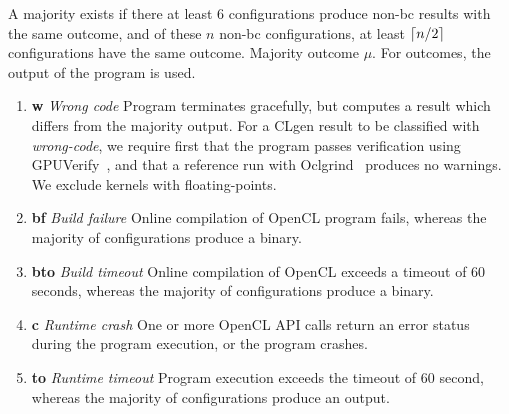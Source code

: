 A majority exists if there at least 6 configurations produce non-bc results with the same outcome, and of these $n$ non-bc configurations, at least $\lceil n/2\rceil$ configurations have the same outcome. Majority outcome $\mu$. For \cmark outcomes, the output of the program is used.

%
\begin{enumerate}
	\item \textbf{w} \emph{Wrong code} Program terminates gracefully, but computes a result which differs from the majority output. For a CLgen result to be classified with \emph{wrong-code}, we require first that the program passes verification using GPUVerify~\cite{Betts2012}, and that a reference run with Oclgrind~\cite{Price2015} produces no warnings. We exclude kernels with floating-points.
	\item \textbf{bf} \emph{Build failure} Online compilation of OpenCL program fails, whereas the majority of configurations produce a binary.
	\item \textbf{bto} \emph{Build timeout} Online compilation of OpenCL exceeds a timeout of 60 seconds, whereas the majority of configurations produce a binary.
	\item \textbf{c} \emph{Runtime crash} One or more OpenCL API calls return an error status during the program execution, or the program crashes.
	\item \textbf{to} \emph{Runtime timeout} Program execution exceeds the timeout of 60 second, whereas the majority of configurations produce an output.
\end{enumerate}



